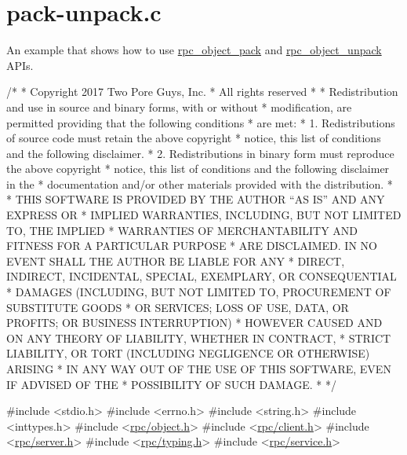 \hypertarget{pack-unpack_8c-example}{}\section{pack-\/unpack.\+c}
An example that shows how to use \hyperlink{object_8h_a8a8454f12dcde323f5daba961febea97}{rpc\+\_\+object\+\_\+pack} and \hyperlink{object_8h_a6ff01b9e6d71ba03e2dff76ede7366f6}{rpc\+\_\+object\+\_\+unpack} A\+P\+Is.


\begin{DoxyCodeInclude}
\textcolor{comment}{/*}
\textcolor{comment}{ * Copyright 2017 Two Pore Guys, Inc.}
\textcolor{comment}{ * All rights reserved}
\textcolor{comment}{ *}
\textcolor{comment}{ * Redistribution and use in source and binary forms, with or without}
\textcolor{comment}{ * modification, are permitted providing that the following conditions}
\textcolor{comment}{ * are met:}
\textcolor{comment}{ * 1. Redistributions of source code must retain the above copyright}
\textcolor{comment}{ *    notice, this list of conditions and the following disclaimer.}
\textcolor{comment}{ * 2. Redistributions in binary form must reproduce the above copyright}
\textcolor{comment}{ *    notice, this list of conditions and the following disclaimer in the}
\textcolor{comment}{ *    documentation and/or other materials provided with the distribution.}
\textcolor{comment}{ *}
\textcolor{comment}{ * THIS SOFTWARE IS PROVIDED BY THE AUTHOR ``AS IS'' AND ANY EXPRESS OR}
\textcolor{comment}{ * IMPLIED WARRANTIES, INCLUDING, BUT NOT LIMITED TO, THE IMPLIED}
\textcolor{comment}{ * WARRANTIES OF MERCHANTABILITY AND FITNESS FOR A PARTICULAR PURPOSE}
\textcolor{comment}{ * ARE DISCLAIMED.  IN NO EVENT SHALL THE AUTHOR BE LIABLE FOR ANY}
\textcolor{comment}{ * DIRECT, INDIRECT, INCIDENTAL, SPECIAL, EXEMPLARY, OR CONSEQUENTIAL}
\textcolor{comment}{ * DAMAGES (INCLUDING, BUT NOT LIMITED TO, PROCUREMENT OF SUBSTITUTE GOODS}
\textcolor{comment}{ * OR SERVICES; LOSS OF USE, DATA, OR PROFITS; OR BUSINESS INTERRUPTION)}
\textcolor{comment}{ * HOWEVER CAUSED AND ON ANY THEORY OF LIABILITY, WHETHER IN CONTRACT,}
\textcolor{comment}{ * STRICT LIABILITY, OR TORT (INCLUDING NEGLIGENCE OR OTHERWISE) ARISING}
\textcolor{comment}{ * IN ANY WAY OUT OF THE USE OF THIS SOFTWARE, EVEN IF ADVISED OF THE}
\textcolor{comment}{ * POSSIBILITY OF SUCH DAMAGE.}
\textcolor{comment}{ *}
\textcolor{comment}{ */}

\textcolor{preprocessor}{#include <stdio.h>}
\textcolor{preprocessor}{#include <errno.h>}
\textcolor{preprocessor}{#include <string.h>}
\textcolor{preprocessor}{#include <inttypes.h>}
\textcolor{preprocessor}{#include <\hyperlink{object_8h}{rpc/object.h}>}
\textcolor{preprocessor}{#include <\hyperlink{client_8h}{rpc/client.h}>}
\textcolor{preprocessor}{#include <\hyperlink{server_8h}{rpc/server.h}>}
\textcolor{preprocessor}{#include <\hyperlink{typing_8h}{rpc/typing.h}>}
\textcolor{preprocessor}{#include <\hyperlink{service_8h}{rpc/service.h}>}


\end{DoxyCodeInclude}
